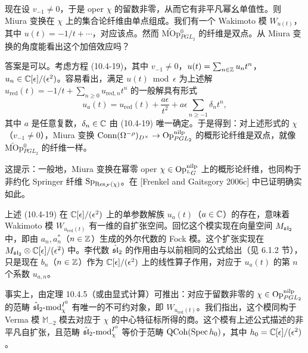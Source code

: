 现在设 $v_{-1}\neq0$，于是 oper $\chi$ 的留数非零，从而它有非平凡幂幺单值性。则 Miura 变换在 $\chi$ 上的集合论纤维由单点组成。我们有一个 Wakimoto 模 $W_{u(t)}$，其中 $u(t)=-1/t+\cdots$，对应该点。然而 $\widetilde{\mathrm{MOp}}{}^0_{PGL_2}$ 的纤维是双点。从 Miura 变换的角度能看出这个加倍效应吗？

答案是可以。考虑方程 (10.4-19)，其中 $v_{-1}\neq0$，$u(t)=\sum_{n\in\mathbb{Z}}u_nt^n$，$u_n\in\mathbb{C}[\epsilon]/(\epsilon^2)$。容易看出，满足 $u(t)\bmod\epsilon$ 为上述解 $u_{\mathrm{red}}(t)=-1/t+\sum_{n\ge0}u_{\mathrm{red},n}t^n$ 的一般解具有形式
\[
    u_a(t)=u_{\mathrm{red}}(t)+\frac{a\epsilon}{t^2}
    +a\epsilon\sum_{n\ge-1}\delta_nt^n,
\]
其中 $a$ 是任意复数，$\delta_n\in\mathbb{C}$ 由 (10.4-19) 唯一确定。于是得到：对上述形式的 $\chi$（$v_{-1}\neq0$），Miura 变换 $\mathrm{Conn}(\Omega^{-\rho})_{D^\times}\to\operatorname{Op}^{\mathrm{nilp}}_{PGL_2}$ 的概形论纤维是双点，就像 $\widetilde{\mathrm{MOp}}{}^0_{PGL_2}$ 的纤维一样。

这提示：一般地，Miura 变换在幂零 oper $\chi\in\operatorname{Op}^{\mathrm{nilp}}_{{}^L G}$ 上的概形论纤维，也同构于非约化 Springer 纤维 $\operatorname{Sp}_{\operatorname{Res}_{\mathcal{F}}(\chi)}$。在 [Frenkel and Gaitsgory 2006c] 中已证明确实如此。

上述 (10.4-19) 在 $\mathbb{C}[\epsilon]/(\epsilon^2)$ 上的单参数解族 $u_a(t)$（$a\in\mathbb{C}$）的存在，意味着 Wakimoto 模 $W_{u_{\mathrm{red}}(t)}$ 有一维的自扩张空间。回忆这个模实现在向量空间 $M_{\mathfrak{sl}_2}$ 中，即由 $a_n,a_n^*$（$n\in\mathbb{Z}$）生成的外尔代数的 Fock 模。这个扩张实现在 $M_{\mathfrak{sl}_2}\otimes\mathbb{C}[\epsilon]/(\epsilon^2)$ 中。李代数 $\hat{\mathfrak{sl}}_2$ 的作用由与以前相同的公式给出（见 6.1.2 节），只是现在 $b_n$（$n\in\mathbb{Z}$）作为 $\mathbb{C}[\epsilon]/(\epsilon^2)$ 上的线性算子作用，对应于 $u_a(t)$ 的第 $n$ 个系数 $u_{a,n}$。

事实上，由定理 10.4.5（或由显式计算）可推出：对应于留数非零的 $\chi\in\operatorname{Op}^{\mathrm{nilp}}_{PGL_2}$ 的范畴 $\hat{\mathfrak{sl}}_2\text{-}\mathrm{mod}_\chi^{I^0}$ 有唯一的不可约对象，即 $W_{u_{\mathrm{red}}(t)}$。我们指出，这个模同构于 Verma 模 $\mathbb{M}_{-2}$ 模去对应于 $\chi$ 的中心特征标所得的商。这个模有上述公式描述的非平凡自扩张，且范畴 $\hat{\mathfrak{sl}}_2\text{-}\mathrm{mod}_\chi^{I^0}$ 等价于范畴 $\mathrm{QCoh}(\operatorname{Spec} h_0)$，其中 $h_0=\mathbb{C}[\epsilon]/(\epsilon^2)$。


